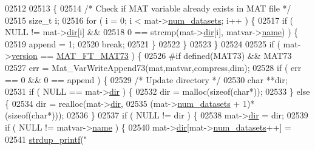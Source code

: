 \begin{DoxyCode}
{{{{{{{{{{{{{{{{{{{{{{{{{{{{{{{{{{{{{{{{{{{{{02512 
02513     \{
02514         \textcolor{comment}{/* Check if MAT variable already exists in MAT file */}
02515         \textcolor{keywordtype}{size\_t} i;
02516         \textcolor{keywordflow}{for} ( i = 0; i < mat->\hyperlink{struct__mat__t_af37d0ba323e65edb27ecd5a2f766a3a4}{num\_datasets}; i++ ) \{
02517             \textcolor{keywordflow}{if} ( NULL != mat->\hyperlink{struct__mat__t_a1bc6c604459d0787801d5e53d365684c}{dir}[i] &&
02518                 0 == strcmp(mat->\hyperlink{struct__mat__t_a1bc6c604459d0787801d5e53d365684c}{dir}[i], matvar->\hyperlink{group___m_a_t_a5d4b55b041e3b4fb50c04337f05ad909}{name}) ) \{
02519                 append = 1;
02520                 \textcolor{keywordflow}{break};
02521             \}
02522         \}
02523     \}
02524 
02525     \textcolor{keywordflow}{if} ( mat->\hyperlink{struct__mat__t_a729c2bc0afc97485057a5af425635b1a}{version} == \hyperlink{group___m_a_t_ggad03442b8378999189d510e3745c702b7a765c5d1d5038947646260dc82483517e}{MAT\_FT\_MAT73} ) \{
02526 \textcolor{preprocessor}{#if defined(MAT73) && MAT73}
02527         err = Mat\_VarWriteAppend73(mat,matvar,compress,dim);
02528         \textcolor{keywordflow}{if} ( err == 0 && 0 == append ) \{
02529             \textcolor{comment}{/* Update directory */}
02530             \textcolor{keywordtype}{char} **dir;
02531             \textcolor{keywordflow}{if} ( NULL == mat->\hyperlink{struct__mat__t_a1bc6c604459d0787801d5e53d365684c}{dir} ) \{
02532                 dir = malloc(\textcolor{keyword}{sizeof}(\textcolor{keywordtype}{char}*));
02533             \} \textcolor{keywordflow}{else} \{
02534                 dir = realloc(mat->\hyperlink{struct__mat__t_a1bc6c604459d0787801d5e53d365684c}{dir},
02535                 (mat->\hyperlink{struct__mat__t_af37d0ba323e65edb27ecd5a2f766a3a4}{num\_datasets} + 1)*(\textcolor{keyword}{sizeof}(\textcolor{keywordtype}{char}*)));
02536             \}
02537             \textcolor{keywordflow}{if} ( NULL != dir ) \{
02538                 mat->\hyperlink{struct__mat__t_a1bc6c604459d0787801d5e53d365684c}{dir} = dir;
02539                 \textcolor{keywordflow}{if} ( NULL != matvar->\hyperlink{group___m_a_t_a5d4b55b041e3b4fb50c04337f05ad909}{name} ) \{
02540                     mat->\hyperlink{struct__mat__t_a1bc6c604459d0787801d5e53d365684c}{dir}[mat->\hyperlink{struct__mat__t_af37d0ba323e65edb27ecd5a2f766a3a4}{num\_datasets}++] =
02541                         \hyperlink{group__mat__util_ga291b08f933c75fb70e3736b669896ebd}{strdup\_printf}(\textcolor{stringliteral}{"%
}}}}}}}}}}}}}}}}}}}}}}}}}}}}}}}}}}}}}}}}}}}}}}
\end{DoxyCode}
